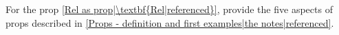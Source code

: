 
For the prop \ref{Rel as prop|\textbf{Rel|referenced}}, provide the five aspects of props described in \ref{Props - definition and first examples|the notes|referenced}.